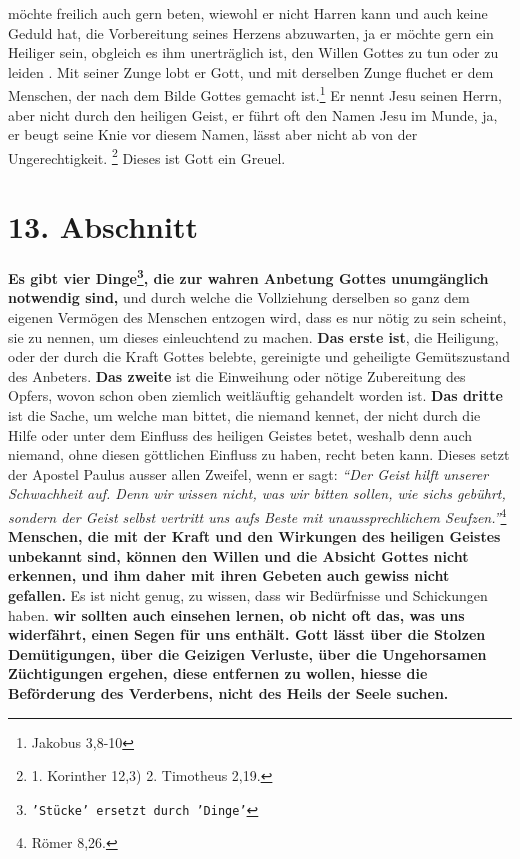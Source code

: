 möchte freilich auch
gern beten, wiewohl er nicht Harren kann und auch keine Geduld 
hat, die
Vorbereitung seines Herzens abzuwarten, ja er möchte gern ein Heiliger
 sein,
obgleich es ihm unerträglich ist, den Willen Gottes zu tun 
oder zu leiden . Mit
seiner Zunge lobt er Gott, und mit derselben Zunge fluchet er dem Menschen, der
nach dem Bilde Gottes gemacht ist.\footnote{Jakobus 3,8-10}
 Er nennt Jesu
seinen Herrn, aber nicht durch den heiligen Geist, er führt oft den Namen
Jesu im Munde, ja, er beugt seine Knie vor diesem Namen, lässt aber nicht ab
von der Ungerechtigkeit. 
\footnote{1. Korinther 12,3) 2. Timotheus 2,19.}
Dieses ist Gott ein Greuel.

\section{13. Abschnitt} \label{kap6_ab13}

\label{ref:06_13_vier_noetige_dinge}
 \textbf{Es gibt vier
Dinge\footnote{\texttt{'Stücke' ersetzt durch 'Dinge'}}, die zur wahren Anbetung
Gottes
unumgänglich
notwendig
sind,} und durch welche die Vollziehung derselben so ganz dem eigenen Vermögen
des Menschen entzogen wird, dass es nur nötig zu sein scheint, sie zu nennen,
um dieses einleuchtend zu machen. \textbf{Das erste ist}, die Heiligung, oder
der durch
die Kraft Gottes belebte, gereinigte und geheiligte Gemütszustand des Anbeters.
\textbf{Das zweite} ist die Einweihung oder nötige Zubereitung des Opfers,
wovon schon
oben ziemlich weitläuftig gehandelt worden ist. \textbf{Das dritte} ist die
Sache, um
welche man bittet, die niemand kennet, der nicht durch die Hilfe oder unter dem
Einfluss des heiligen Geistes  betet, weshalb
denn auch
niemand, ohne diesen
göttlichen Einfluss zu haben, recht beten kann. Dieses setzt der Apostel
Paulus ausser allen Zweifel, wenn er sagt:
\textit{"`Der Geist hilft unserer
Schwachheit auf. Denn wir wissen nicht, was wir bitten sollen, wie sichs
gebührt, sondern der Geist selbst vertritt uns aufs Beste mit
unaussprechlichem Seufzen."'}\footnote{Römer 8,26.}
\textbf{Menschen, die mit der
Kraft
und den Wirkungen des heiligen Geistes unbekannt sind, können den Willen und die
Absicht Gottes nicht erkennen, und ihm daher mit ihren Gebeten auch gewiss
nicht gefallen.} Es ist nicht genug, zu wissen, dass wir Bedürfnisse und
Schickungen haben.  \textbf{wir sollten auch einsehen
lernen, ob nicht oft das,
was uns
widerfährt, einen Segen  für uns enthält. Gott lässt über die
Stolzen
Demütigungen, über die Geizigen Verluste, über die
Ungehorsamen Züchtigungen
ergehen, diese entfernen zu wollen, hiesse die Beförderung des Verderbens, nicht
des Heils der Seele suchen.}


